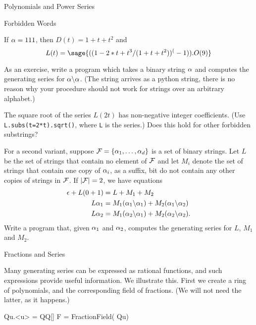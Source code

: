 \begin{chap}{Polynomials and Power Series}
\begin{sect}{Forbidden Words}
%
\begin{para}
If $\alpha=111$, then $D(t)=1+t+t^2$ and 
\[
    L(t) = \sage{((1-2*t+ t^3/(1+t+t^2))^(-1)).O(9)}
\]
\end{para}
%
\begin{para}
As an exercise, write a program which takes a binary string $\alpha$ and
computes the generating series for $\alpha\backslash\alpha$. (The string arrives
as a python string, there is no reason why your procedure should not work
for strings over an arbitrary alphabet.)
\end{para}
%
\begin{para}
The square root of the series $L(2t)$ has non-negative integer coefficients.
(Use \verb|L.subs(t=2*t).sqrt()|, where \verb|L| is the series.)
Does this hold for other forbidden substrings?
\end{para}
%
\begin{para}
For a second variant, suppose ${\mathcal F}=\{\alpha_{1},\ldots,\alpha_{d}\}$ is a set of binary strings. 
Let $L$ be the set of strings that contain no element of ${\mathcal F}$ and let $M_i$ 
denote the set of strings that contain one copy of $\alpha_i$, as a suffix, bit do not
contain any other copies of strings in ${\mathcal F}$. If $|{\mathcal F}|=2$, we have
equations
\begin{align*}
    \epsilon+L(0+1) &= L +M_1 +M_2\\
    L\alpha_1 &= M_1(\alpha_1\backslash\alpha_1) +M_2(\alpha_1\backslash\alpha_2)\\
    L\alpha_2 &= M_1(\alpha_2\backslash\alpha_1) +M_2(\alpha_2\backslash\alpha_2).
\end{align*}
Write a program that, given $\alpha_1$ and $\alpha_2$, computes the generating
series for $L$, $M_1$ and $M_2$.
\end{para}
%
\end{sect}
%
\begin{sect}{Fractions and Series}
%
\begin{para}
Many generating series can be expressed as rational functions, and 
such expressions provide useful information. We illustrate this.
First we create a ring of polynomials, and the corresponding field
of fractions. (We will not need the latter, as it happens.)
\end{para}
%
\begin{sageblock}
    Qu.<u> = QQ[]
    F = FractionField( Qu)
\end{sageblock}


\end{sect}
\end{chap}
